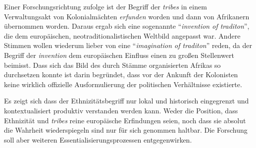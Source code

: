 \documentclass[a4paper, 12pt]{article}
\begin{document}
\begin{onehalfspace}
Einer Forschungsrichtung zufolge ist der Begriff der \emph{tribes} in einem Verwaltungsakt von Kolonialmächten \emph{erfunden} worden und dann von Afrikanern übernommen worden. Daraus ergab sich eine sogenannte "`\emph{invention of traditon}"', die dem europäischen, neotraditionalistischen Weltbild angepasst war. Andere Stimmen wollen wiederum lieber von eine "`\emph{imagination of traditon}"' reden, da der Begriff der \emph{invention} dem europäischen Einfluss einen zu großen Stellenwert beimisst. Dass sich das Bild des durch Stämme organisierten Afrikas so durchsetzen konnte ist darin begründet, dass vor der Ankunft der Kolonisten keine wirklich offizielle Ausformulierung der politischen Verhältnisse existierte. 

Es zeigt sich dass der Ethnizitätsbegriff nur lokal und historisch eingegrenzt und kontextualisiert produktiv verstanden werden kann. Weder die Position, dass Ethnizität und \emph{tribes} reine europäische Erfindungen seien, noch dass sie absolut die Wahrheit wiederspiegeln sind nur für sich genommen haltbar. Die Forschung soll aber weiteren Essentialisierungsprozessen entgegenwirken.



\end{onehalfspace}
\nocite{*}
%
\printbibliography
\end{document}
